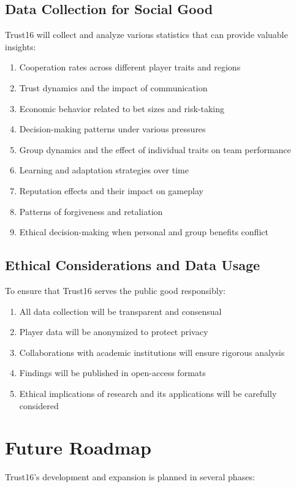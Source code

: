 \documentclass[12pt,a4paper]{article}
\begin{document}
\subsection{Data Collection for Social Good}
Trust16 will collect and analyze various statistics that can provide valuable insights:
\begin{enumerate}
    \item Cooperation rates across different player traits and regions
    \item Trust dynamics and the impact of communication
    \item Economic behavior related to bet sizes and risk-taking
    \item Decision-making patterns under various pressures
    \item Group dynamics and the effect of individual traits on team performance
    \item Learning and adaptation strategies over time
    \item Reputation effects and their impact on gameplay
    \item Patterns of forgiveness and retaliation
    \item Ethical decision-making when personal and group benefits conflict
\end{enumerate}

\subsection{Ethical Considerations and Data Usage}
To ensure that Trust16 serves the public good responsibly:
\begin{enumerate}
    \item All data collection will be transparent and consensual
    \item Player data will be anonymized to protect privacy
    \item Collaborations with academic institutions will ensure rigorous analysis
    \item Findings will be published in open-access formats
    \item Ethical implications of research and its applications will be carefully considered
\end{enumerate}

\section{Future Roadmap}

Trust16's development and expansion is planned in several phases:
\end{document}
